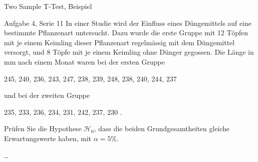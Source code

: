 \documentclass{beamer}
\begin{document}
\begin{frame}{Two Sample T-Test, Beispiel}
\begin{beamerboxesrounded}[shadow]{Aufgabe 4, Serie 11}
In einer Studie wird der Einfluss eines Düngemittels auf eine bestimmte Pflanzenart 
untersucht. Dazu wurde die erste Gruppe mit 12 Töpfen mit je einem Keimling dieser 
Pflanzenart regelmässig mit dem Düngemittel versorgt, und 8 Töpfe mit je einem Keimling
ohne Dünger gegossen. Die Länge in mm nach einem Monat waren bei der ersten Gruppe
\begin{center}
245, 240, 236, 243, 247, 238, 239, 248, 238, 240, 244, 237
\end{center}
und bei der zweiten Gruppe
\begin{center}
235, 233, 236, 234, 231, 242, 237, 230 .
\end{center}

\begin{outline}
\item Prüfen Sie die Hypothese $\mathcal{H}_0$, dass die beiden Grundgesamtheiten gleiche
Erwartungswerte haben, mit $\alpha = 5\%$.
\item [\dots]
\end{outline}
\end{beamerboxesrounded}
\end{frame}
\end{document}

